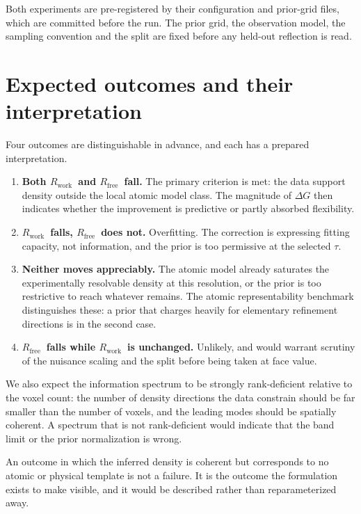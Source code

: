 \documentclass[11pt]{article}
\newcommand{\Rwork}{\ensuremath{R_{\mathrm{work}}}}
\newcommand{\Rfree}{\ensuremath{R_{\mathrm{free}}}}
\begin{document}
Both experiments are pre-registered by their configuration and prior-grid files, which are
committed before the run. The prior grid, the observation model, the sampling convention and
the split are fixed before any held-out reflection is read.

\section{Expected outcomes and their interpretation}
\label{sec:expected}
Four outcomes are distinguishable in advance, and each has a prepared interpretation.

\begin{enumerate}[nosep]
  \item \textbf{Both \Rwork\ and \Rfree\ fall.} The primary criterion is met: the data support
    density outside the local atomic model class. The magnitude of $\Delta G$ then indicates
    whether the improvement is predictive or partly absorbed flexibility.
  \item \textbf{\Rwork\ falls, \Rfree\ does not.} Overfitting. The correction is expressing
    fitting capacity, not information, and the prior is too permissive at the selected $\tau$.
  \item \textbf{Neither moves appreciably.} The atomic model already saturates the
    experimentally resolvable density at this resolution, or the prior is too restrictive to
    reach whatever remains. The atomic representability benchmark distinguishes these: a prior
    that charges heavily for elementary refinement directions is in the second case.
  \item \textbf{\Rfree\ falls while \Rwork\ is unchanged.} Unlikely, and would warrant
    scrutiny of the nuisance scaling and the split before being taken at face value.
\end{enumerate}

We also expect the information spectrum to be strongly rank-deficient relative to the voxel
count: the number of density directions the data constrain should be far smaller than the
number of voxels, and the leading modes should be spatially coherent. A spectrum that is not
rank-deficient would indicate that the band limit or the prior normalization is wrong.

An outcome in which the inferred density is coherent but corresponds to no atomic or
physical template is not a failure. It is the outcome the formulation exists to make
visible, and it would be described rather than reparameterized away.
\end{document}
